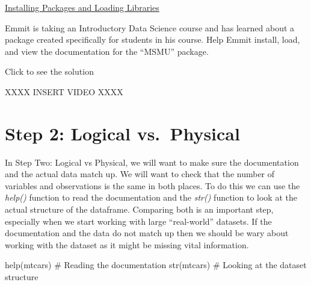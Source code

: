 \documentclass[
  letterpaper,
  DIV=11,
  numbers=noendperiod]{scrreprt}
\newenvironment{Shaded}{\begin{snugshade}}{\end{snugshade}}
\newcommand{\CommentTok}[1]{\textcolor[rgb]{0.37,0.37,0.37}{#1}}
\newcommand{\FunctionTok}[1]{\textcolor[rgb]{0.28,0.35,0.67}{#1}}
\newcommand{\NormalTok}[1]{\textcolor[rgb]{0.00,0.23,0.31}{#1}}
\begin{document}
\begin{watch}{}{}
    \href{https://youtu.be/6UPqEI9-uFE}{Installing Packages and Loading Libraries}
\end{watch}

\begin{tcolorbox}[enhanced jigsaw, colbacktitle=quarto-callout-tip-color!10!white, breakable, bottomrule=.15mm, colframe=quarto-callout-tip-color-frame, left=2mm, opacitybacktitle=0.6, title=\textcolor{quarto-callout-tip-color}{\faLightbulb}\hspace{0.5em}{Try it Out}, leftrule=.75mm, opacityback=0, rightrule=.15mm, titlerule=0mm, bottomtitle=1mm, colback=white, toprule=.15mm, arc=.35mm, toptitle=1mm, coltitle=black]

Emmit is taking an Introductory Data Science course and has learned
about a package created specifically for students in his course. Help
Emmit install, load, and view the documentation for the ``MSMU''
package.

Click to see the solution

XXXX INSERT VIDEO XXXX

\end{tcolorbox}

\section{Step 2: Logical
vs.~Physical}\label{step-2-logical-vs.-physical}

In Step Two: Logical vs Physical, we will want to make sure the
documentation and the actual data match up. We will want to check that
the number of variables and observations is the same in both places. To
do this we can use the \emph{help()} function to read the documentation
and the \emph{str()} function to look at the actual structure of the
dataframe. Comparing both is an important step, especially when we start
working with large ``real-world'' datasets. If the documentation and the
data do not match up then we should be wary about working with the
dataset as it might be missing vital information.

\begin{Shaded}
\begin{Highlighting}[]
\FunctionTok{help}\NormalTok{(mtcars) }\CommentTok{\# Reading the documentation}
\FunctionTok{str}\NormalTok{(mtcars) }\CommentTok{\# Looking at the dataset structure}
\end{Highlighting}
\end{Shaded}
\end{document}
